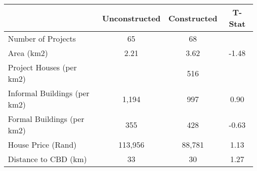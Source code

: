 \begin{tabular}{l*{1}{ccc}}
 &Unconstructed &Constructed &T-Stat  \\
\hline 
Number of Projects &         65 &         68 &   \\
Area (km2) &       2.21 &       3.62 &      -1.48  \\
Project Houses (per km2) &  &        516 &   \\
Informal Buildings (per km2) &      1,194 &        997 &       0.90  \\
Formal Buildings (per km2) &        355 &        428 &      -0.63  \\
House Price (Rand) &    113,956 &     88,781 &       1.13  \\
Distance to CBD (km) &         33 &         30 &       1.27  \\
\hline
\end{tabular}